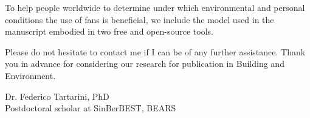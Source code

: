 \documentclass[11pt,a4paper,roman]{moderncv}        %
\begin{document}
To help people worldwide to determine under which environmental and personal conditions the use of fans is beneficial, we include the model used in the manuscript embodied in two free and open-source tools.

Please do not hesitate to contact me if I can be of any further assistance. Thank you in advance for considering our research for publication in Building and Environment.

\bigskip

Dr. Federico Tartarini, PhD\\
Postdoctoral scholar at SinBerBEST, BEARS
\end{document}
